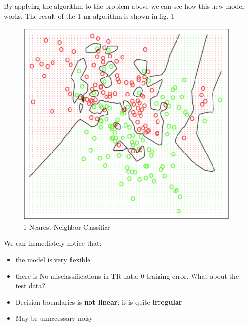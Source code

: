 \documentclass[../main.tex]{subfiles}
\begin{document}
\noindent By applying the algorithm to the problem above we can see how this new model works.
The result of the 1-nn algorithm is shown in fig. \ref{fig:3_1nn_eg}\\

\begin{figure}
    \centering
    \includegraphics[scale = 0.3]{lectures/3_K_nn/3_1nn_eg.png}
    \caption{1-Nearest Neighbor Classifier}
    \label{fig:3_1nn_eg}
\end{figure}

We can immediately notice that:
\begin{itemize}
    \item the model is very flexible
    \item there is No misclassifications in TR data: $0$ training error. What about the test data?
    \item Decision boundaries is \textbf{not linear}: it is quite \textbf{irregular}
    \item May be unnecessary noisy 
\end{itemize}
\end{document}
